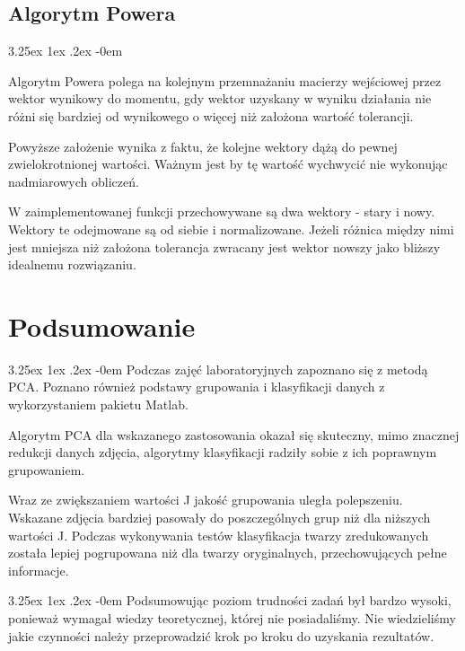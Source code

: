 \documentclass[11pt, a4paper]{article}
\makeatletter
\newcommand{\fbi}{\leavevmode{\parindent=1em\indent}}
\renewcommand\paragraph{\@startsection{paragraph}{5}{\z@}
  {3.25ex \@plus1ex \@minus.2ex}
  {-0em}
  {\normalfont\normalsize\bfseries}}
\makeatother
\begin{document}
\subsection{Algorytm Powera}
\paragraph{}



\fbi
Algorytm Powera polega na kolejnym przemnażaniu macierzy wejściowej przez wektor wynikowy do momentu, gdy wektor uzyskany w wyniku działania nie różni się bardziej od wynikowego o więcej niż założona wartość tolerancji.

\fbi
Powyższe założenie wynika z faktu, że kolejne wektory dążą do pewnej zwielokrotnionej wartości. Ważnym jest by tę wartość wychwycić nie wykonując nadmiarowych obliczeń.

\fbi
W zaimplementowanej funkcji przechowywane są dwa wektory - stary i nowy. Wektory te odejmowane są od siebie i normalizowane. Jeżeli różnica między nimi jest mniejsza niż założona tolerancja zwracany jest wektor nowszy jako bliższy idealnemu rozwiązaniu.

\newpage
\section{Podsumowanie}
\paragraph{}
Podczas zajęć laboratoryjnych zapoznano się z metodą PCA. Poznano również podstawy grupowania i klasyfikacji danych z wykorzystaniem pakietu Matlab.

\fbi
Algorytm PCA dla wskazanego zastosowania okazał się skuteczny, mimo znacznej redukcji danych zdjęcia, algorytmy klasyfikacji radziły sobie z ich poprawnym grupowaniem.

\fbi
Wraz ze zwiększaniem wartości J jakość grupowania uległa polepszeniu. Wskazane zdjęcia bardziej pasowały do poszczególnych grup niż dla niższych wartości J. Podczas wykonywania testów klasyfikacja twarzy zredukowanych została lepiej pogrupowana niż dla twarzy oryginalnych, przechowujących pełne informacje.

\paragraph{}
\fbi
Podsumowując poziom trudności zadań był bardzo wysoki, ponieważ wymagał wiedzy teoretycznej, której nie posiadaliśmy. Nie wiedzieliśmy jakie czynności należy przeprowadzić krok po kroku do uzyskania rezultatów.
\end{document}
